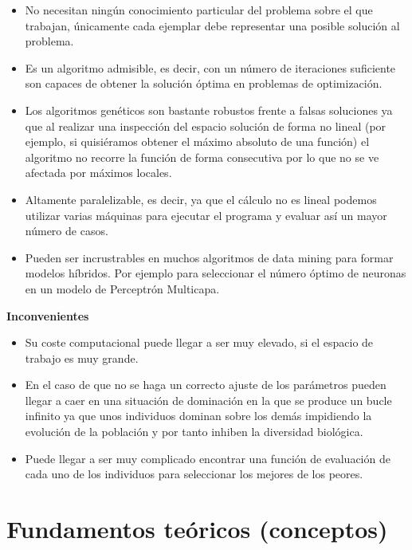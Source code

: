 \documentclass[
  a4paper,
  DIV=11,
  numbers=noendperiod]{scrreprt}
\begin{document}
\begin{itemize}
\item
  No necesitan ningún conocimiento particular del problema sobre el que
  trabajan, únicamente cada ejemplar debe representar una posible
  solución al problema.
\item
  Es un algoritmo admisible, es decir, con un número de iteraciones
  suficiente son capaces de obtener la solución óptima en problemas de
  optimización.
\item
  Los algoritmos genéticos son bastante robustos frente a falsas
  soluciones ya que al realizar una inspección del espacio solución de
  forma no lineal (por ejemplo, si quisiéramos obtener el máximo
  absoluto de una función) el algoritmo no recorre la función de forma
  consecutiva por lo que no se ve afectada por máximos locales.
\item
  Altamente paralelizable, es decir, ya que el cálculo no es lineal
  podemos utilizar varias máquinas para ejecutar el programa y evaluar
  así un mayor número de casos.
\item
  Pueden ser incrustrables en muchos algoritmos de data mining para
  formar modelos híbridos. Por ejemplo para seleccionar el número óptimo
  de neuronas en un modelo de Perceptrón Multicapa.
\end{itemize}

\textbf{Inconvenientes}

\begin{itemize}
\item
  Su coste computacional puede llegar a ser muy elevado, si el espacio
  de trabajo es muy grande.
\item
  En el caso de que no se haga un correcto ajuste de los parámetros
  pueden llegar a caer en una situación de dominación en la que se
  produce un bucle infinito ya que unos individuos dominan sobre los
  demás impidiendo la evolución de la población y por tanto inhiben la
  diversidad biológica.
\item
  Puede llegar a ser muy complicado encontrar una función de evaluación
  de cada uno de los individuos para seleccionar los mejores de los
  peores.
\end{itemize}

\hypertarget{fundamentos-teuxf3ricos-conceptos}{%
\section{Fundamentos teóricos
(conceptos)}\label{fundamentos-teuxf3ricos-conceptos}}
\end{document}
